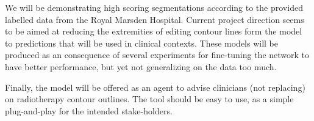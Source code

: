 \documentclass[11pt,twoside]{report}
\begin{document}
We will be demonstrating high scoring segmentations according to the provided labelled data from the Royal Marsden Hospital. Current project direction seems to be aimed at reducing the extremities of editing contour lines form the model to predictions that will be used in clinical contexts. These models will be produced as an consequence of several experiments for fine-tuning the network to have better performance, but yet not generalizing on the data too much.

Finally, the model will be offered as an agent to advise clinicians (not replacing) on radiotherapy contour outlines. The tool should be easy to use, as a simple plug-and-play for the intended stake-holders. 

\printbibliography
{}
\end{document}
